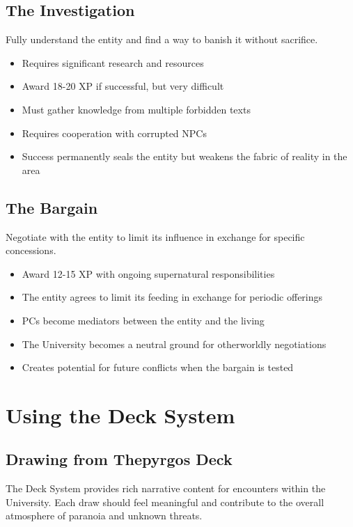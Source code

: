 \documentclass[11pt]{article}
\begin{document}
\subsection{The Investigation}

Fully understand the entity and find a way to banish it without sacrifice.
\begin{itemize}
\item Requires significant research and resources
\item Award 18-20 XP if successful, but very difficult
\item Must gather knowledge from multiple forbidden texts
\item Requires cooperation with corrupted NPCs
\item Success permanently seals the entity but weakens the fabric of reality in the area
\end{itemize}

\subsection{The Bargain}

Negotiate with the entity to limit its influence in exchange for specific concessions.
\begin{itemize}
\item Award 12-15 XP with ongoing supernatural responsibilities
\item The entity agrees to limit its feeding in exchange for periodic offerings
\item PCs become mediators between the entity and the living
\item The University becomes a neutral ground for otherworldly negotiations
\item Creates potential for future conflicts when the bargain is tested
\end{itemize}

\section{Using the Deck System}

\subsection{Drawing from Thepyrgos Deck}

The Deck System provides rich narrative content for encounters within the University. Each draw should feel meaningful and contribute to the overall atmosphere of paranoia and unknown threats.
\end{document}
